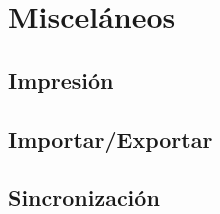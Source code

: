 \chapter{Miscel\'aneos}
\label{sec:miscelaneo}

\section{Impresi\'on}

\section{Importar/Exportar}

\section{Sincronizaci\'on}